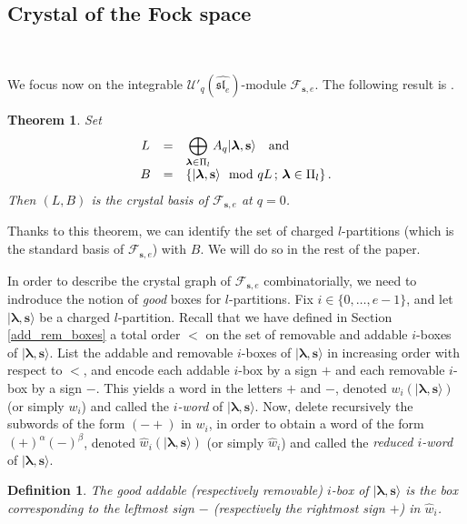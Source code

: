 \documentclass[twoside,12pt]{amsart}
\theoremstyle{plain}
\newcommand{\cF}{\mathcal{F}}
\newcommand{\bs}{\mathbf{s}}
\newcommand{\al}{\alpha}
\newcommand{\be}{\beta}
\newcommand{\la}{\lambda}
\newcommand{\bla}{\boldsymbol{\la}}
\newcommand{\hw}{\widehat{w}}
\newcommand{\Ue}{\mathcal{U}'_q (\widehat{\mathfrak{sl}_e})}
\newcommand{\dispst}{\displaystyle}
\newtheorem{defi}[num]{Definition}
\newtheorem{thm}[num]{Theorem}
\theoremstyle{remark}
\begin{document}
\subsection{Crystal of the Fock space}\label{crystal_graph}\

We focus now on the integrable $\Ue$-module $\cF_{\bs,e}$.
The following result is \cite[Theorem 3.7]{JMMO1991}.

\begin{thm}\label{thm_crystal_basis} 
Set 
\begin{equation*}
\begin{array}{ccl}
L
&=& \dispst
\bigoplus_{\bla\in\Pi_l} A_q |\bla,\bs\rangle \text{\quad and}
\\
B
&=&
\left\{ |\bla,\bs\rangle \mod qL \, ; \, \bla\in\Pi_l \right\}.
\end{array}
\end{equation*}
Then $(L,B)$ is the crystal basis of $\cF_{\bs,e}$ at $q=0$.
\end{thm}

Thanks to this theorem, we can identify
the set of charged $l$-partitions (which is the standard basis of $\cF_{\bs,e}$)
with $B$.
We will do so in the rest of the paper.


In order to describe the crystal graph of $\cF_{\bs,e}$ combinatorially, we need to indroduce
the notion of \textit{good} boxes for $l$-partitions.
Fix $i\in\{0,\dots,e-1\}$, and let $|\bla,\bs\rangle$ be a charged $l$-partition.
Recall that we have defined in Section \ref{add_rem_boxes} a total order $<$ on the set of removable and addable $i$-boxes of 
$|\bla,\bs\rangle$.
List the addable and removable $i$-boxes of $|\bla,\bs\rangle$ in increasing order with respect to $<$,
and encode each addable $i$-box by a sign $+$ and each removable $i$-box by a sign $-$.
This yields a word in the letters $+$ and $-$, denoted $w_i(|\bla,\bs\rangle)$ 
(or simply $w_i$) and called the \textit{$i$-word} of $|\bla,\bs\rangle$.
Now, delete recursively the subwords of the form $(-+)$ in $w_i$, in order
to obtain a word of the form $(+)^\al(-)^\be$, denoted 
$\hw_i(|\bla,\bs\rangle)$ (or simply $\hw_i$) and called the \textit{reduced $i$-word} of $|\bla,\bs\rangle$.



\begin{defi}
The \textit{good} addable (respectively removable)
$i$-box of $|\bla,\bs\rangle$ is the box corresponding to the leftmost sign $-$ 
(respectively the rightmost sign $+$) in $\hw_i$. 
\end{defi}
\end{document}

